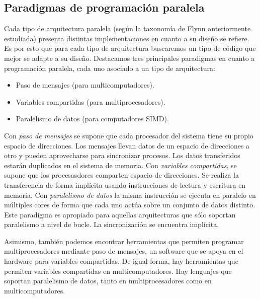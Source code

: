 \subsection{Paradigmas de programación paralela}
Cada tipo de arquitectura paralela (según la taxonomía de Flynn anteriormente estudiada) presenta distintas implementaciones en cuanto a su diseño se refiere. Es por esto que para cada tipo de arquitectura buscaremos un tipo de código que mejor se adapte a su diseño. Destacamos tres principales paradigmas en cuanto a programación paralela, cada uno asociado a un tipo de arquitectura:
\begin{itemize}
    \item Paso de mensajes (para multicomputadores).
    \item Variables compartidas (para multiprocesadores). 
    \item Paralelismo de datos (para computadores SIMD).
\end{itemize}
Con \emph{paso de mensajes} se supone que cada procesador del sistema tiene su propio espacio de direcciones. Los mensajes llevan datos de un espacio de direcciones a otro y pueden aprovecharse para sincronizar procesos. Los datos transferidos estarán duplicados en el sistema de memoria. Con \emph{variables compartidas}, se supone que los procesasdores comparten espacio de direcciones. Se realiza la transferencia de forma implícita usando instrucciones de lectura y escritura en memoria. Con \emph{paralelismo de datos} la misma instrucción se ejecuta en paralelo en múltiples cores de forma que cada uno actúa sobre un conjunto de datos distinto. Este paradigma es apropiado para aquellas arquitecturas que sólo soportan paralelismo a nivel de bucle. La sincronización se encuentra implícita. 

Asimismo, también podemos encontrar herramientas que permiten programar multiprocesadores mediante paso de mensajes, un software que se apoya en el hardware para variables compartidas. De igual forma, hay herramientas que permiten variables compartidas en multicomputadores. Hay lenguajes que soportan paralelismo de datos, tanto en multiprocesadores como en multicomputadores.

